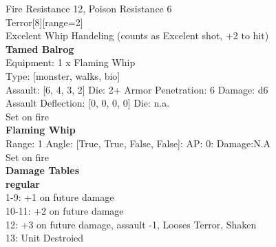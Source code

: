 Fire Resistance 12, Poison Resistance 6\\ 
Terror[8][range=2]\\ 
Excelent Whip Handeling (counts as Excelent shot, +2 to hit)\\ 


{\bf Tamed Balrog } \\
Equipment: 1 x Flaming Whip \\
Type: [monster, walks, bio] \\

Assault: [6, 4, 3, 2] Die: 2+ Armor Penetration: 6 Damage: d6 \\
Assault Deflection: [0, 0, 0, 0] Die: n.a.\\
\indent Set on fire\\ 
 



{\bf Flaming Whip } \\



Range: 1  Angle: [True, True, False, False]: AP: 0: Damage:N.A \\
Set on fire\\ 




 





{\bf Damage Tables} \\
 {\bf regular } \\
1-9: +1 on future damage \\
10-11: +2 on future damage \\
12: +3 on future damage, assault -1, Looses Terror, Shaken \\
13: Unit Destroied \\










\pagebreak
